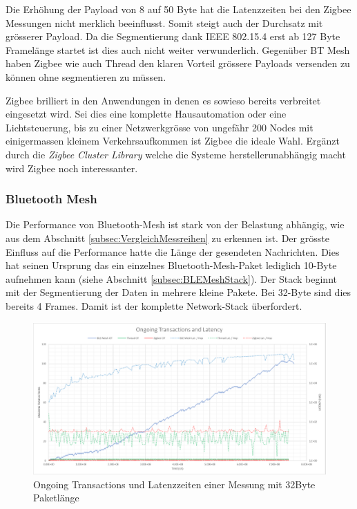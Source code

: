 Die Erhöhung der Payload von 8 auf 50 Byte hat die Latenzzeiten bei den Zigbee Messungen nicht merklich beeinflusst. Somit steigt auch der Durchsatz mit grösserer Payload. Da die Segmentierung dank IEEE 802.15.4 erst ab 127 Byte Framelänge startet ist dies auch nicht weiter verwunderlich. Gegenüber BT Mesh haben Zigbee wie auch Thread den klaren Vorteil grössere Payloads versenden zu können ohne segmentieren zu müssen.

Zigbee brilliert in den Anwendungen in denen es sowieso bereits verbreitet eingesetzt wird. Sei dies eine komplette Hausautomation oder eine Lichtsteuerung, bis zu einer Netzwerkgrösse von ungefähr 200 Nodes mit einigermassen kleinem Verkehrsaufkommen ist Zigbee die ideale Wahl. Ergänzt durch die \textit{Zigbee Cluster Library} welche die Systeme herstellerunabhängig macht wird Zigbee noch interessanter.


\subsubsection{Bluetooth Mesh}\label{subsubsec:FazitBluetoothMesh}
Die Performance von Bluetooth-Mesh ist stark von der Belastung abhängig, wie aus dem Abschnitt \ref{subsec:VergleichMessreihen} zu erkennen ist. Der grösste Einfluss auf die Performance hatte die Länge der gesendeten Nachrichten. Dies hat seinen Ursprung das ein einzelnes Bluetooth-Mesh-Paket lediglich 10-Byte aufnehmen kann (siehe Abschnitt \ref{subsec:BLEMeshStack}). Der Stack beginnt mit der Segmentierung der Daten in mehrere kleine Pakete. Bei 32-Byte sind dies bereits 4 Frames. Damit ist der komplette Network-Stack überfordert. 

\begin{figure}[h]
	\centering
	\includegraphics[width=1.0\textwidth]{graphics/Bluetooth_Mesh_Big_Payload_Issue.png}
	\caption{Ongoing Transactions und Latenzzeiten einer Messung mit 32Byte Paketlänge}\label{fig:Bluetooth_Mesh_Big_Payload_Issue}
\end{figure}

